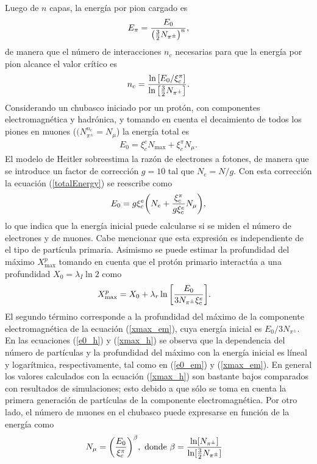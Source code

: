 		Luego de $n$ capas, la energía por pion cargado es
		\begin{align}
		E_{\pi} = \frac{E_0}{\qty(\frac{3}{2}N_{\pi^{\pm}})^n},
		\end{align}
		de manera que el número de interacciones $n_c$ necesarias para que la energía por pion alcance el valor crítico es
		\begin{align}
		n_c = \frac{\ln \qty[E_0 / \xi_c^{\pi}]}{\ln \qty[\frac{3}{2}N_{\pi^{\pm}}]}.
		\end{align}
		Considerando un chubasco iniciado por un protón, con componentes electromagnética y hadrónica, y tomando en cuenta el decaimiento de todos los piones en muones ($(N_{\pi^{\pm}}^{n_c} = N_{\mu}$) la energía total es
		\begin{align} \label{totalEnergy}
		E_0 = \xi_c^e N_{\text{max}}+\xi_c^{\pi} N_{\mu}.
		\end{align}
		El modelo de Heitler sobreestima la razón de electrones a fotones, de manera que se introduce un factor de corrección $g=10$ tal que $N_e = N/g$. Con esta corrección la ecuación (\ref{totalEnergy}) se reescribe como
		\begin{align} \label{e0_h}
		E_0 = g \xi_{c}^{e} \qty(N_e + \frac{\xi_c^{\pi}}{g \xi_c^{e}} N_{\mu}),
		\end{align}
		lo que indica que la energía inicial puede calcularse si se miden el número de electrones y de muones. Cabe mencionar que esta expresión es independiente de el tipo de partícula primaria. Asimismo se puede estimar la profundidad del máximo $X_{\text{max}}^{p}$ tomando en cuenta que el protón primario interactúa a una profundidad $X_0=\lambda_I \ln 2$ como
		\begin{align} \label{xmax_h}
		X_{\text{max}}^{p} &= X_0 + \lambda_r \ln \qty[\frac{E_0}{3 N_{\pi^{\pm}}\xi_c^e}].
		\end{align}
		El segundo término corresponde a la profundidad del máximo de la componente electromagnética de la ecuación (\ref{xmax_em}), cuya energía inicial es $E_0/3N_{\pi^{\pm}}$. En las ecuaciones (\ref{e0_h}) y (\ref{xmax_h}) se observa que la dependencia del número de partículas y la profundidad del máximo con la energía inicial es líneal y logarítmica, respectivamente, tal como en (\ref{e0_em}) y (\ref{xmax_em}). En general los valores calculados con la ecuación (\ref{xmax_h}) son bastante bajos comparados con resultados de simulaciones; esto debido a que sólo se toma en cuenta la primera generación de partículas de la componente electromagnética. Por otro lado, el número de muones en el chubasco puede expresarse en función de la energía como
		\begin{align}
		N_{\mu} &= \qty(\frac{E_0}{\xi_c^{\pi}})^{\beta}, \text{ donde } \beta = \frac{\ln[N_{\pi^{\pm}}]}{\ln[\frac{3}{2}N_{\pi^{\pm}}]}
		\end{align}

